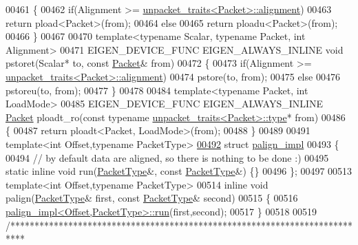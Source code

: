 \begin{DoxyCode}
{00461 \{
00462   \textcolor{keywordflow}{if}(Alignment >= \hyperlink{struct_eigen_1_1internal_1_1unpacket__traits}{unpacket\_traits<Packet>::alignment})
00463     \textcolor{keywordflow}{return} pload<Packet>(from);
00464   \textcolor{keywordflow}{else}
00465     \textcolor{keywordflow}{return} ploadu<Packet>(from);
00466 \}
00467 
00470 \textcolor{keyword}{template}<\textcolor{keyword}{typename} Scalar, \textcolor{keyword}{typename} Packet, \textcolor{keywordtype}{int} Alignment>
00471 EIGEN\_DEVICE\_FUNC EIGEN\_ALWAYS\_INLINE \textcolor{keywordtype}{void} pstoret(Scalar* to, \textcolor{keyword}{const} \hyperlink{union_eigen_1_1internal_1_1_packet}{Packet}& from)
00472 \{
00473   \textcolor{keywordflow}{if}(Alignment >= \hyperlink{struct_eigen_1_1internal_1_1unpacket__traits}{unpacket\_traits<Packet>::alignment})
00474     pstore(to, from);
00475   \textcolor{keywordflow}{else}
00476     pstoreu(to, from);
00477 \}
00478 
00484 \textcolor{keyword}{template}<\textcolor{keyword}{typename} Packet, \textcolor{keywordtype}{int} LoadMode>
00485 EIGEN\_DEVICE\_FUNC EIGEN\_ALWAYS\_INLINE \hyperlink{union_eigen_1_1internal_1_1_packet}{Packet} ploadt\_ro(\textcolor{keyword}{const} \textcolor{keyword}{typename} 
      \hyperlink{union_eigen_1_1internal_1_1_packet}{unpacket\_traits<Packet>::type}* from)
00486 \{
00487   \textcolor{keywordflow}{return} ploadt<Packet, LoadMode>(from);
00488 \}
00489 
00491 \textcolor{keyword}{template}<\textcolor{keywordtype}{int} Offset,\textcolor{keyword}{typename} PacketType>
\hyperlink{struct_eigen_1_1internal_1_1palign__impl}{00492} \textcolor{keyword}{struct }\hyperlink{struct_eigen_1_1internal_1_1palign__impl}{palign\_impl}
00493 \{
00494   \textcolor{comment}{// by default data are aligned, so there is nothing to be done :)}
00495   \textcolor{keyword}{static} \textcolor{keyword}{inline} \textcolor{keywordtype}{void} run(\hyperlink{struct_eigen_1_1_packet_type}{PacketType}&, \textcolor{keyword}{const} \hyperlink{struct_eigen_1_1_packet_type}{PacketType}&) \{\}
00496 \};
00497 
00513 \textcolor{keyword}{template}<\textcolor{keywordtype}{int} Offset,\textcolor{keyword}{typename} PacketType>
00514 \textcolor{keyword}{inline} \textcolor{keywordtype}{void} palign(\hyperlink{struct_eigen_1_1_packet_type}{PacketType}& first, \textcolor{keyword}{const} \hyperlink{struct_eigen_1_1_packet_type}{PacketType}& second)
00515 \{
00516   \hyperlink{struct_eigen_1_1internal_1_1palign__impl}{palign\_impl<Offset,PacketType>::run}(first,second);
00517 \}
00518 
00519 \textcolor{comment}{/***************************************************************************}
}
\end{DoxyCode}
